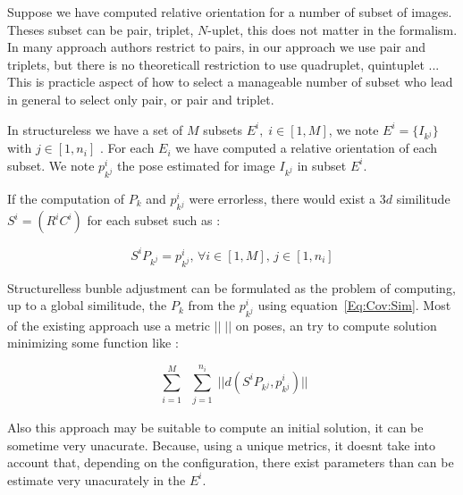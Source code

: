 Suppose we have computed relative orientation for a number of subset
of images. Theses subset can be pair, triplet, $N$-uplet, this does
not matter in the formalism.  In many approach authors restrict to
pairs, in our approach we use pair and triplets, but there is
no theoreticall restriction to use quadruplet, quintuplet ...  This is
practicle aspect of how to select a manageable number of subset  who lead in
general to select only pair, or pair and triplet.


In structureless we have a set of  $M$ subsets  $E^i, \; i \in [1,M]$, 
we note   $E^i =  \{I_{k^j}\}$ with $j \in [1,n_i]$  .  For each $E_i$
we have computed a relative orientation of each subset.  We note $p^i_{k^j}$ the pose
estimated for image $I_{k^j}$  in subset $E^i$. 

If the computation of $P_k$ and $p^i_{k^j}$  were errorless, there would
exist a $3d$ similitude $S^i = (R^i C^i) $ for each subset such as :


\begin{center}
\end{center}


\begin{equation}
    S^i  P_{k^j}  =  p^i_{k^j}  ,\,  \forall i \in [1,M] , \, j \in [1,n_i] \label{Eq:Cov:Sim}
\end{equation}


Structurelless bunble adjustment can be formulated as the problem of computing,
up to a global similitude, the $P_k$ from the $p^i_{k^j}$ using equation~\ref{Eq:Cov:Sim}.
Most of the existing approach use a  metric $||\;||$ on poses, an try to compute  solution
minimizing some function like :

\begin{equation}
    \sum\limits_{\substack{i=1 }}^{M} \sum \limits_{\substack{j=1 }}^{n_i}  || d(S^i  P_{k^j} , p^i_{k^j} ) ||  \label{Eq:Cov:MinDist}
\end{equation}

Also this approach may be suitable to compute an initial solution, it can
be sometime very unacurate.  Because, using a unique metrics, it doesnt take
into account that, depending on the configuration, there exist parameters
than can be estimate very unacurately in the $E^i$. 

